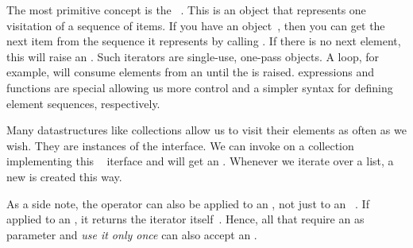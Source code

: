 The most primitive concept is the ~\cite{PEP234,PSF:P3D:TPSL:BIT:IT,PSF:P3D:G:I2}.
This is an object that represents one visitation of a sequence of items.
If you have an  object~, then you can get the next item from the sequence it represents by calling .
If there is no next element, this will raise an .
Such iterators are single-use, one-pass objects.
A  loop, for example, will consume elements from an  until the  is raised.
 expressions and functions are special  allowing us more control and a simpler syntax for defining element sequences, respectively.

Many datastructures like collections allow us to visit their elements as often as we wish.
They are instances of the  interface.
We can invoke  on a collection  implementing this ~\cite{PSF:P3D:G:I1} iterface and will get an .
Whenever we iterate over a list, a new  is created this way.

As a side note, the operator  can also be applied to an , not just to an ~\cite{PSF:P3D:TPSL:BIT:IT}.
If applied to an , it returns the iterator itself~\cite{PSF:P3D:G:I2}.
Hence, all  that require an  as parameter and \emph{use it only once} can also accept an .

